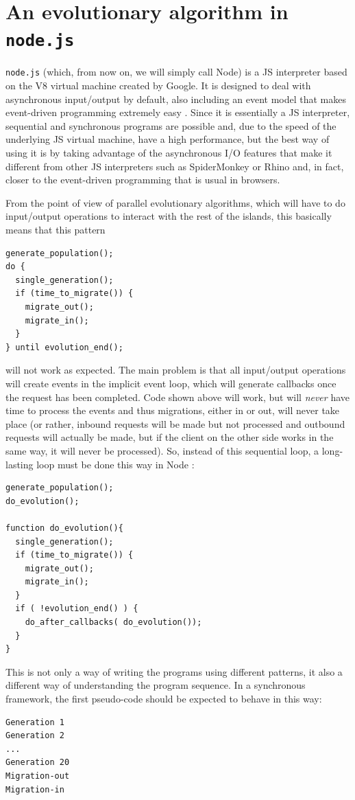 \documentclass{sig-alternate}
\begin{document}
\section{An evolutionary algorithm in {\tt node.js}}
\label{sec:node}

{\tt node.js} (which, from now on, we will simply call Node) is a JS
interpreter based on the V8 virtual machine created by Google. It is
designed to deal with asynchronous input/output by default, also including an event model that makes event-driven
programming extremely easy \cite{5617064}. Since it is essentially a
JS interpreter, sequential and synchronous programs are possible and,
due to the speed of the underlying JS virtual machine, have a high
performance, but the best way of using it is by taking advantage of
the asynchronous I/O features that make it different from other JS
interpreters such as SpiderMonkey or Rhino and, in fact, closer to the
event-driven programming that is usual in browsers.

From the point of view of parallel evolutionary algorithms, which will
have to do input/output operations to interact with the rest of the
islands, this
basically means that this pattern
\begin{lstlisting}
generate_population();
do {
  single_generation();
  if (time_to_migrate()) {
    migrate_out();
    migrate_in();
  }
} until evolution_end();
\end{lstlisting}
will not work as expected. The main problem is that all input/output
operations will create events in the implicit event loop, which will
generate callbacks once the request has been completed. Code shown
above will work, but will {\em never} have time to process the events
and thus migrations, either in or out, will never take place (or
rather, inbound requests will be made but not processed and outbound
requests will actually be made, but if the client on the other side
works in the same way, it will never be processed). So, instead of
this sequential loop, a long-lasting loop must be done this way in
Node \cite{nodejs:patterns}:
\begin{lstlisting}
generate_population();
do_evolution();

function do_evolution(){
  single_generation();
  if (time_to_migrate()) {
    migrate_out();
    migrate_in();
  }
  if ( !evolution_end() ) {
    do_after_callbacks( do_evolution());
  }
}
\end{lstlisting}

This is not only a way of writing the programs using different patterns,
it also a different way of understanding the program sequence. In a
synchronous framework, the first pseudo-code should be expected to behave
in this way:
\begin{lstlisting}
Generation 1
Generation 2
...
Generation 20
Migration-out
Migration-in
\end{lstlisting}
\end{document}
